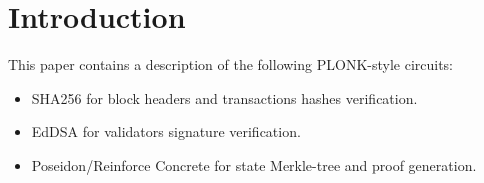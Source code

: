 \section{Introduction}
\label{section:introduction}
This paper contains a description of the following PLONK-style circuits:
\begin{itemize}
	\item SHA256 for block headers and transactions hashes verification. 
	\item EdDSA for validators signature verification.
	\item Poseidon/Reinforce Concrete for state Merkle-tree and proof generation. 
\end{itemize}